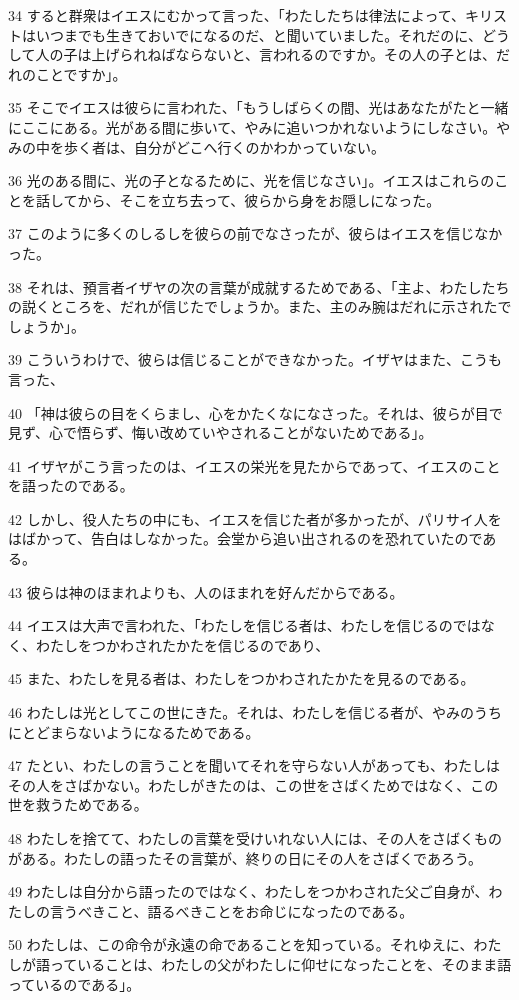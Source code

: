 \par 34 すると群衆はイエスにむかって言った、「わたしたちは律法によって、キリストはいつまでも生きておいでになるのだ、と聞いていました。それだのに、どうして人の子は上げられねばならないと、言われるのですか。その人の子とは、だれのことですか」。
\par 35 そこでイエスは彼らに言われた、「もうしばらくの間、光はあなたがたと一緒にここにある。光がある間に歩いて、やみに追いつかれないようにしなさい。やみの中を歩く者は、自分がどこへ行くのかわかっていない。
\par 36 光のある間に、光の子となるために、光を信じなさい」。イエスはこれらのことを話してから、そこを立ち去って、彼らから身をお隠しになった。
\par 37 このように多くのしるしを彼らの前でなさったが、彼らはイエスを信じなかった。
\par 38 それは、預言者イザヤの次の言葉が成就するためである、「主よ、わたしたちの説くところを、だれが信じたでしょうか。また、主のみ腕はだれに示されたでしょうか」。
\par 39 こういうわけで、彼らは信じることができなかった。イザヤはまた、こうも言った、
\par 40 「神は彼らの目をくらまし、心をかたくなになさった。それは、彼らが目で見ず、心で悟らず、悔い改めていやされることがないためである」。
\par 41 イザヤがこう言ったのは、イエスの栄光を見たからであって、イエスのことを語ったのである。
\par 42 しかし、役人たちの中にも、イエスを信じた者が多かったが、パリサイ人をはばかって、告白はしなかった。会堂から追い出されるのを恐れていたのである。
\par 43 彼らは神のほまれよりも、人のほまれを好んだからである。
\par 44 イエスは大声で言われた、「わたしを信じる者は、わたしを信じるのではなく、わたしをつかわされたかたを信じるのであり、
\par 45 また、わたしを見る者は、わたしをつかわされたかたを見るのである。
\par 46 わたしは光としてこの世にきた。それは、わたしを信じる者が、やみのうちにとどまらないようになるためである。
\par 47 たとい、わたしの言うことを聞いてそれを守らない人があっても、わたしはその人をさばかない。わたしがきたのは、この世をさばくためではなく、この世を救うためである。
\par 48 わたしを捨てて、わたしの言葉を受けいれない人には、その人をさばくものがある。わたしの語ったその言葉が、終りの日にその人をさばくであろう。
\par 49 わたしは自分から語ったのではなく、わたしをつかわされた父ご自身が、わたしの言うべきこと、語るべきことをお命じになったのである。
\par 50 わたしは、この命令が永遠の命であることを知っている。それゆえに、わたしが語っていることは、わたしの父がわたしに仰せになったことを、そのまま語っているのである」。

